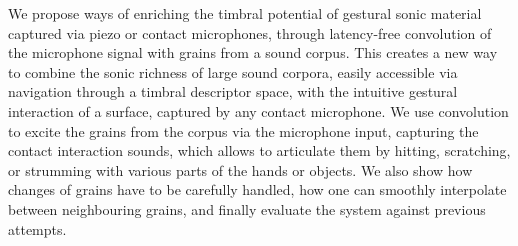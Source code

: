 We propose ways of enriching the timbral potential of gestural sonic material captured via piezo or contact microphones, through latency-free convolution of the microphone signal with grains from a sound corpus.
%
This creates a new way to combine the sonic richness of large sound corpora, easily accessible via navigation through a timbral descriptor space, with the intuitive gestural interaction of a surface, captured by any contact microphone.
%
We use convolution to excite the grains from the corpus via the microphone input, capturing the contact interaction sounds, which allows to articulate them by hitting, scratching, or strumming with various parts of the hands or objects.
%
We also show how changes of grains have to be carefully handled, how one can smoothly interpolate between neighbouring grains, and finally evaluate the system against previous attempts.
